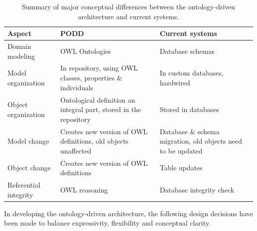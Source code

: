 \documentclass{elsarticle}
\begin{document}
\begin{table}[htdp]
\footnotesize
\centering
\caption{Summary of major conceptual differences between the ontology-driven
architecture and current systems.}\label{tab:diff}
\begin{center}
\begin{tabular}{p{50pt}|p{120pt}|p{120pt}}
\textbf{Aspect}  & \textbf{PODD} & \textbf{Current systems}\\
\hline
Domain modeling & OWL Ontologies & Database schemas\\
\hline
Model organization & In repository, using OWL classes, properties \& individuals & In custom databases, hardwired\\
\hline
Object organization & Ontological definition an integral part, stored in the repository & Stored in databases\\
\hline
Model change & Creates new version of OWL definitions, old objects unaffected & Database \& schema migration, old objects need to be updated\\
\hline
Object change & Creates new version of OWL definitions & Table updates\\
\hline
Referential integrity & OWL reasoning & Database integrity check
\end{tabular}
\end{center}
\end{table}

In developing the ontology-driven architecture,
the following design decisions have been made to balance expressivity,
flexibility and conceptual clarity.
\end{document}
